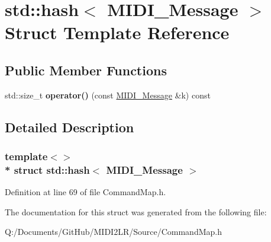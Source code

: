 \hypertarget{structstd_1_1hash_3_01_m_i_d_i___message_01_4}{}\section{std\+:\+:hash$<$ M\+I\+D\+I\+\_\+\+Message $>$ Struct Template Reference}
\label{structstd_1_1hash_3_01_m_i_d_i___message_01_4}
\subsection*{Public Member Functions}
\begin{DoxyCompactItemize}
\item 
std\+::size\+\_\+t {\bfseries operator()} (const \hyperlink{struct_m_i_d_i___message}{M\+I\+D\+I\+\_\+\+Message} \&k) const \hypertarget{structstd_1_1hash_3_01_m_i_d_i___message_01_4_a1c8b2702e501c6ce0defd656a832915b}{}\label{structstd_1_1hash_3_01_m_i_d_i___message_01_4_a1c8b2702e501c6ce0defd656a832915b}

\end{DoxyCompactItemize}


\subsection{Detailed Description}
\subsubsection*{template$<$$>$\\*
struct std\+::hash$<$ M\+I\+D\+I\+\_\+\+Message $>$}



Definition at line 69 of file Command\+Map.\+h.



The documentation for this struct was generated from the following file\+:\begin{DoxyCompactItemize}
\item 
Q\+:/\+Documents/\+Git\+Hub/\+M\+I\+D\+I2\+L\+R/\+Source/Command\+Map.\+h\end{DoxyCompactItemize}

